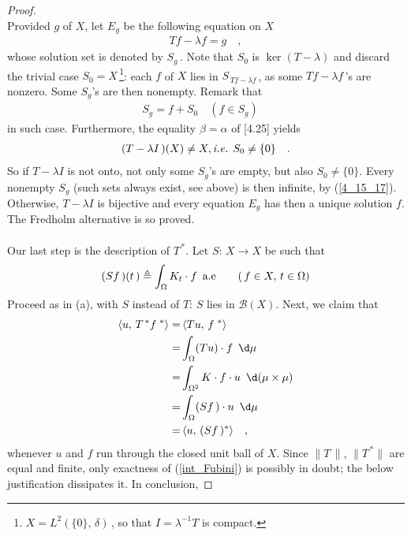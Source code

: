 \begin{proof}
\\
Provided  $g$ of $X$, let $E_g$ be the following equation on $X$
\begin{align}Tf-\lambda f =g \quad ,\end{align}
whose solution set is denoted by $S_g\,$. Note that $S_0$ is $\ker (T-\lambda)$ and discard the trivial case $S_0=X\,$\footnote{\eg$ X=L^2(\{0\},\, \delta)\,$, so that $I=\lambda^{\minus 1} T $ is compact. }: each $f$ of $X $ lies in $S_{\,Tf-\lambda f\,} $, as some $Tf-\lambda f\,$'s are nonzero. Some $S_g$'s are then nonempty. Remark that 
\begin{align}\label{4_15_17}
S_g= f + S_0 \quad (f\in S_g) \quad 
\end{align}
in such case. Furthermore, the equality $\beta= \alpha $ of [4.25] yields 
\begin{align}
(T-\lambda I\,)(X)\neq X , \text{\textit{i.e.} }  S_0 \neq\{0\}  \quad .
\end{align}
So if $T-\lambda I$ is not onto, not only some $S_g$'s are empty, but also $S_0\neq\{0\}$. Every nonempty $S_g$ (such sets always exist, see above) is then infinite, by (\ref{4_15_17}).\\
Otherwise, $T-\lambda I$ is bijective and every equation $E_g$ has then a unique solution $f$. The Fredholm alternative is so proved. \\
\\
Our last step is the description of $T^{\,\ast}$. Let $S:\, X\to X$ be such that
\begin{align}
(Sf\,)(t\,)\triangleq \int_\Omega K_t \cdot f \,\,\, \text{a.e}\quad \quad (\,f\in X,\, t\in \Omega)
\end{align}
Proceed as in (a), with $S$ instead of $T$: $S$ lies in $\mathscr{B}(X)$. Next, we claim that 
\begin{align}
\langle u,\, T^{\,\ast} f^{\,\,\ast}  \rangle = &\, \langle Tu,\,f^{\,\,\ast}   \rangle\\
=&  \int_{\Omega} (T  u ) \cdot  f \,\, \,\d\mu \\
\label{int_Fubini}=& \int_{\Omega^2} K\cdot f \cdot  u \,\,\, \d(\mu\times\mu) \\
=&  \int_{\Omega} (S  f\, ) \cdot  u \,\,\, \d\mu\,  \\
=&\, \langle u,\, (S f\, )^\ast \rangle \quad ,
\end{align}
whenever $u$ and $f$ run through the closed unit ball of $X$. Since $\|T\, \|$, $\| T^{\,\ast} \|$ are equal and finite, only exactness of (\ref{int_Fubini}) is possibly in doubt; the below justification dissipates it. In conclusion,

\end{proof}
